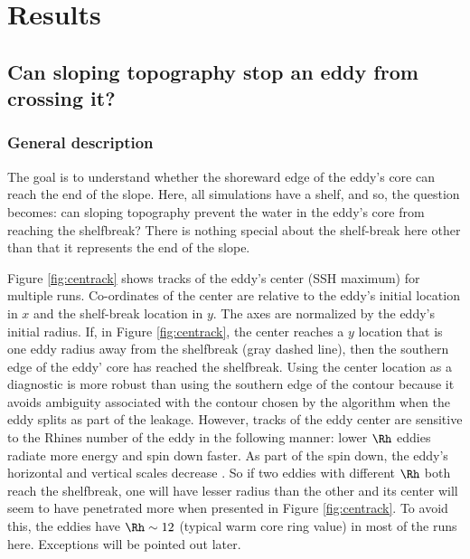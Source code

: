 \section{Results}
\label{sec-5}
\subsection{Can sloping topography stop an eddy from crossing it?}
\label{sec-5-1}
\label{sec:south}
\subsubsection*{General description}
\label{sec-5-1-1}
\label{sec:trackdesc}
The goal is to understand whether the shoreward edge of the eddy's core can reach the end of the slope. Here, all simulations have a shelf, and so, the question becomes: can sloping topography prevent the water in the eddy's core from reaching the shelfbreak? There is nothing special about the shelf-break here other than that it represents the end of the slope.

Figure \ref{fig:centrack} shows tracks of the eddy's center (SSH maximum) for multiple runs.  Co-ordinates of the center are relative to the eddy's initial location in $x$ and the shelf-break location in $y$. The axes are normalized by the eddy's initial radius. If, in Figure \ref{fig:centrack}, the center reaches a $y$ location that is one eddy radius away from the shelfbreak (gray dashed line), then the southern edge of the eddy' core has reached the shelfbreak. Using the center location as a diagnostic is more robust than using the southern edge of the contour because it avoids ambiguity associated with the contour chosen by the algorithm when the eddy splits as part of the leakage. However, tracks of the eddy center are sensitive to the Rhines number of the eddy in the following manner: lower $\Rh$ eddies radiate more energy and spin down faster. As part of the spin down, the eddy's horizontal and vertical scales decrease \citep{Flierl1984}. So if two eddies with different $\Rh$ both reach the shelfbreak, one will have lesser radius than the other and its center will seem to have penetrated more when presented in Figure \ref{fig:centrack}. To avoid this, the eddies have $\Rh \sim 12$ (typical warm core ring value) in most of the runs here. Exceptions will be pointed out later.

